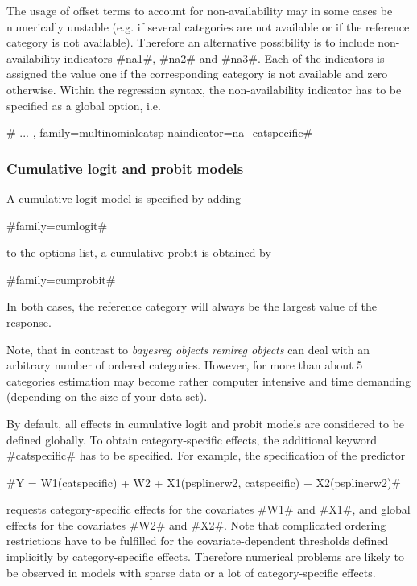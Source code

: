 The usage of offset terms to account for non-availability may in
some cases be numerically unstable (e.g. if several categories are
not available or if the reference category is not available).
Therefore an alternative possibility is to include non-availability
indicators #na1#, #na2# and #na3#. Each of the indicators is
assigned the value one if the corresponding category is not
available and zero otherwise. Within the regression syntax, the
non-availability indicator has to be specified as a global option,
i.e.

# ... , family=multinomialcatsp naindicator=na_catspecific#


\subsubsection*{Cumulative logit and probit models}

A cumulative logit model is specified by adding

#family=cumlogit#

to the options list, a cumulative probit is obtained by

#family=cumprobit#

In both cases, the reference category will always be the largest
value of the response.

Note, that in contrast to {\em bayesreg objects} {\em remlreg
objects} can deal with an arbitrary number of ordered categories.
However, for more than about 5 categories estimation may become
rather computer intensive and time demanding (depending on the size
of your data set).

By default, all effects in cumulative logit and probit models are
considered to be defined globally. To obtain category-specific
effects, the additional keyword #catspecific# has to be specified.
For example, the specification of the predictor

 #Y = W1(catspecific) + W2 + X1(psplinerw2, catspecific) + X2(psplinerw2)#

requests category-specific effects for the covariates #W1# and #X1#,
and global effects for the covariates #W2# and #X2#. Note that
complicated ordering restrictions have to be fulfilled for the
covariate-dependent thresholds defined implicitly by
category-specific effects. Therefore numerical problems are likely
to be observed in models with sparse data or a lot of
category-specific effects.

